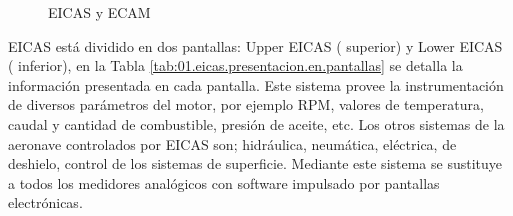 \begin{figure}[!h]
  \centering
  \caption{EICAS y ECAM}
  \label{fig:eicas+ecam}
\end{figure}


EICAS est\'a dividido en  dos pantallas: Upper EICAS ( superior) y Lower EICAS ( inferior),  
en la Tabla \ref{tab:01.eicas.presentacion.en.pantallas} se detalla la informaci\'on presentada en cada pantalla.%
Este sistema provee la instrumentación de diversos parámetros del motor, por ejemplo RPM, valores de temperatura, caudal y cantidad de combustible, presión de aceite, etc. 
Los otros sistemas de la aeronave controlados por EICAS son; hidráulica, neumática, eléctrica, de deshielo, control de los sistemas de superficie. 
Mediante este sistema se sustituye a todos los medidores analógicos con software impulsado por pantallas electrónicas.

